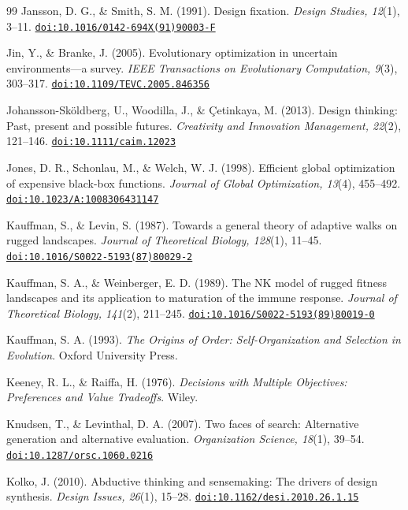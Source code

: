 \documentclass[10pt,twocolumn]{article}
\providecommand{\doi}[1]{\href{https://doi.org/#1}{\nolinkurl{doi:#1}}}
\theoremstyle{definition}
\begin{document}
\begin{thebibliography}{99}
 Jansson, D. G., \& Smith, S. M. (1991). Design fixation. \textit{Design Studies, 12}(1), 3--11. \doi{10.1016/0142-694X(91)90003-F}

 Jin, Y., \& Branke, J. (2005). Evolutionary optimization in uncertain environments---a survey. \textit{IEEE Transactions on Evolutionary Computation, 9}(3), 303--317. \doi{10.1109/TEVC.2005.846356}

 Johansson-Sk{\"o}ldberg, U., Woodilla, J., \& \c{C}etinkaya, M. (2013). Design thinking: Past, present and possible futures. \textit{Creativity and Innovation Management, 22}(2), 121--146. \doi{10.1111/caim.12023}

 Jones, D. R., Schonlau, M., \& Welch, W. J. (1998). Efficient global optimization of expensive black-box functions. \textit{Journal of Global Optimization, 13}(4), 455--492. \doi{10.1023/A:1008306431147}

 Kauffman, S., \& Levin, S. (1987). Towards a general theory of adaptive walks on rugged landscapes. \textit{Journal of Theoretical Biology, 128}(1), 11--45. \doi{10.1016/S0022-5193(87)80029-2}

 Kauffman, S. A., \& Weinberger, E. D. (1989). The NK model of rugged fitness landscapes and its application to maturation of the immune response. \textit{Journal of Theoretical Biology, 141}(2), 211--245. \doi{10.1016/S0022-5193(89)80019-0}

 Kauffman, S. A. (1993). \textit{The Origins of Order: Self-Organization and Selection in Evolution}. Oxford University Press.

 Keeney, R. L., \& Raiffa, H. (1976). \textit{Decisions with Multiple Objectives: Preferences and Value Tradeoffs}. Wiley.

 Knudsen, T., \& Levinthal, D. A. (2007). Two faces of search: Alternative generation and alternative evaluation. \textit{Organization Science, 18}(1), 39--54. \doi{10.1287/orsc.1060.0216}

 Kolko, J. (2010). Abductive thinking and sensemaking: The drivers of design synthesis. \textit{Design Issues, 26}(1), 15--28. \doi{10.1162/desi.2010.26.1.15}


\end{thebibliography}
\end{document}
